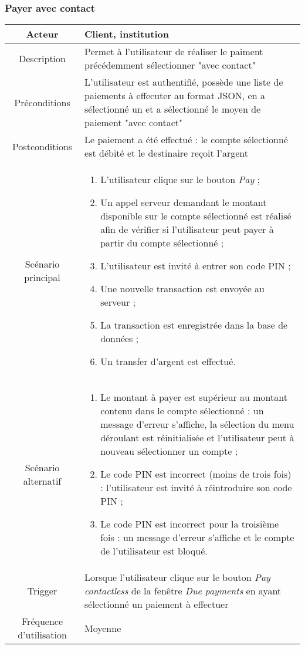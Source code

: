 \documentclass{article}
\begin{document}
\newpage


\subsubsection{Payer avec contact}
\begin{table}[h!]

\begin{tabular}{|c|p{11cm}|}
\hline
Acteur & Client, institution \\
\hline
Description & Permet à l'utilisateur de réaliser le paiment précédemment sélectionner "avec contact" \\
\hline
Préconditions & L'utilisateur est authentifié, possède une liste de paiements à effecuter au format JSON, en a sélectionné un et a sélectionné le moyen de paiement "avec contact" \\
\hline
Postconditions & Le paiement a été effectué : le compte sélectionné est débité et le destinaire reçoit l'argent \\
\hline
Scénario principal & \begin{enumerate}
\item L'utilisateur clique sur le bouton \emph{Pay} ;
\item Un appel serveur demandant le montant disponible sur le compte sélectionné est réalisé afin de vérifier si l'utilisateur peut payer à partir du compte sélectionné ;
\item L'utilisateur est invité à entrer son code PIN ;
\item Une nouvelle transaction est envoyée au serveur ;
\item La transaction est enregistrée dans la base de données ;
\item Un transfer d'argent est effectué.
\end{enumerate} \\
\hline
Scénario alternatif & \begin{enumerate}
\item Le montant à payer est supérieur au montant contenu dans le compte sélectionné : un message d'erreur s'affiche, la sélection du menu déroulant est réinitialisée et l'utilisateur peut à nouveau sélectionner un compte ;
\item Le code PIN est incorrect (moins de trois fois) : l'utilisateur est invité à réintroduire son code PIN ;
\item Le code PIN est incorrect pour la troisième fois : un message d'erreur s'affiche et le compte de l'utilisateur est bloqué.
\end{enumerate} \\
\hline
Trigger & Lorsque l'utilisateur clique sur le bouton \emph{Pay contactless} de la fenêtre \emph{Due payments} en ayant sélectionné un paiement à effectuer \\
\hline
Fréquence d'utilisation & Moyenne \\
\hline
\end{tabular}

\end{table}
\end{document}
